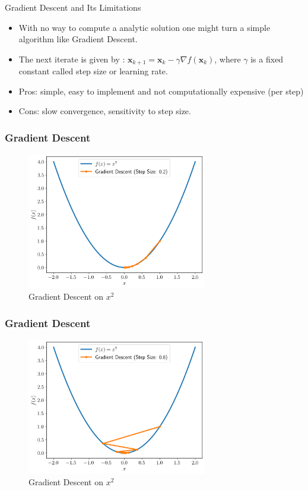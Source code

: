 \documentclass{beamer}
\begin{document}
\begin{frame}{Gradient Descent and Its Limitations}
	\begin{itemize}
		\item With no way to compute a analytic solution one might turn a simple algorithm like Gradient Descent. \pause
		\item The next iterate is given by : $\bm x_{k+1} = \bm x_k - \gamma \nabla f(\bm x_k)$, where $\gamma$ is a fixed constant called step size or learning rate. \pause
		\item Pros: simple, easy to implement and not computationally expensive (per step) \pause
		\item Cons: slow convergence, sensitivity to step size.\pause
	\end{itemize}
\end{frame}
\begin{frame}[t]
	\frametitle{Gradient Descent}
	\begin{figure}[htpb]
		\centering
		\includegraphics[width=0.7\textwidth]{./figs/gradient_descent_low_learning_rate}
		\caption{Gradient Descent on $x^2$}
		\label{fig:}
	\end{figure}
\end{frame}
\begin{frame}[t]
	\frametitle{Gradient Descent}
	\begin{figure}[htpb]
		\centering
		\includegraphics[width=0.7\textwidth]{./figs/gradient_descent_high_learning_rate}
		\caption{Gradient Descent on $x^2$}
		\label{fig:}
	\end{figure}
\end{frame}
\end{document}
